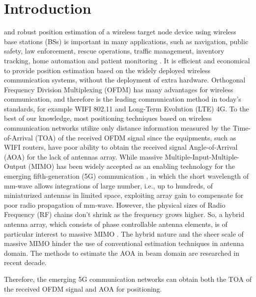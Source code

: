 \documentclass[journal]{IEEEtran}
\begin{document}
\section{Introduction}
\label{sec:intro}
 and robust position estimation of a wireless target node device using wireless base stations (BSs) is important in many applications, such as navigation, public safety, law enforcement, rescue operations, traffic management, inventory tracking, home automation and patient monitoring \cite{bialer2016location}. It is efficient and economical to provide position estimation based on the widely deployed wireless communication systems, without the deployment of extra hardware. Orthogonal Frequency Division Multiplexing (OFDM) has many advantages for wireless communication, and therefore is the leading communication method in today’s standards, for example WIFI 802.11 and Long-Term Evolution (LTE) 4G. To the best of our knowledge, most positioning techniques based on wireless communication networks utilize only distance information measured by the Time-of-Arrival (TOA) of the received OFDM signal since the equipments, such as WIFI routers, have poor ability to obtain the received signal Angle-of-Arrival (AOA) for the lack of antennas array. While massive Multiple-Input-Multiple-Output (MIMO) has been widely accepted as an enabling technology for the emerging fifth-generation (5G) communication \cite{wang2014cellular,roh2014millimeter,niu2015survey}, in which the short wavelength of mm-wave allows integrations of large number, i.e., up to hundreds, of miniaturized antennas in limited space, exploiting array gain to compensate for poor radio propagation of mm-wave. However, the physical sizes of Radio Frequency (RF) chains don't shrink as the frequency grows higher\cite{dawn200960}. So, a hybrid antenna array, which consists of phase controllable antenna elements, is of particular interest to massive MIMO \cite{roh2014millimeter}. The hybrid nature and the sheer scale of massive MIMO hinder the use of conventional estimation techniques in antenna domain\cite{zhang2015massive,guo2012hybrid}. The methods to estimate the AOA in beam domain are researched in recent decade.

Therefore, the emerging 5G communication networks can obtain both the TOA of the received OFDM signal and  AOA for positioning. 
\end{document}
